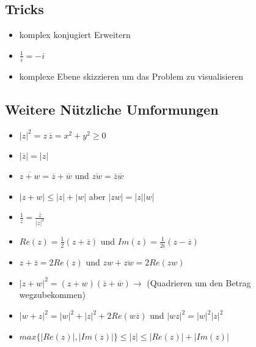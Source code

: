 \documentclass[a4paper,12pt]{article} %
\begin{document}
\subsection{Tricks}
\begin{itemize}
\item komplex konjugiert Erweitern
\item $\frac{1}{i} = -i$
\item komplexe Ebene skizzieren um das Problem zu visualisieren
\end{itemize}
\subsection{Weitere Nützliche Umformungen}
\begin{itemize}
\item $|z|^2 = z \,  \overline{z} = x^2+y^2 \geq 0$
\item $|\overline{z}| = |z|$
\item $\overline{z+w} = \overline{z} + \overline{w}$ und $\overline{zw} = \overline{z} \overline{w}$
\item $|z+w| \leq |z| + |w|$ aber $|z w| = |z| |w|$
\item $\frac{1}{z} = \frac{\overline{z}}{|z|^2}$
\item $Re(z) = \frac{1}{2}(z+\overline{z})$ und $Im(z) = \frac{1}{2i}(z-\overline{z})$
\item $z + \overline{z} = 2 Re(z)$ und $zw + \overline{zw} = 2 Re(zw)$
\item $|z+w|^2 = (z+w) (\overline{z} + \overline{w}) \rightarrow $ (Quadrieren um den Betrag wegzubekommen)
\item $|w+z|^2 = |w|^2+|z|^2+2 Re(w\overline{z})$ und $|wz|^2 = |w|^2 |z|^2$
\item $max \{ |Re(z)|,|Im(z)| \} \leq |z| \leq |Re(z)| + |Im(z)|$
\end{itemize}
\end{document}
